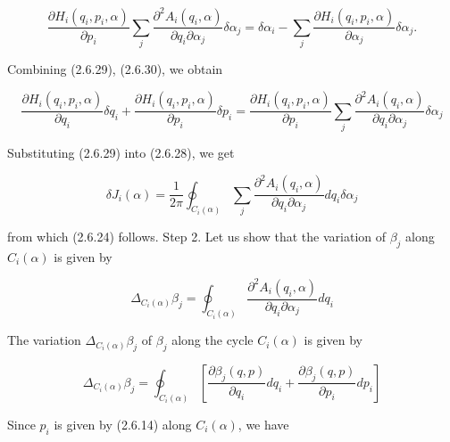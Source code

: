 \documentclass{article}
\begin{document}
\begin{equation*}
\frac{\partial H_{i}\left(q_{i}, p_{i}, \alpha\right)}{\partial p_{i}} \sum_{j} \frac{\partial^{2} A_{i}\left(q_{i}, \alpha\right)}{\partial q_{i} \partial \alpha_{j}} \delta \alpha_{j}=\delta \alpha_{i}-\sum_{j} \frac{\partial H_{i}\left(q_{i}, p_{i}, \alpha\right)}{\partial \alpha_{j}} \delta \alpha_{j} . \tag{2.6.30}
\end{equation*}
 

Combining (2.6.29), (2.6.30), we obtain
 
\begin{equation*}
\frac{\partial H_{i}\left(q_{i}, p_{i}, \alpha\right)}{\partial q_{i}} \delta q_{i}+\frac{\partial H_{i}\left(q_{i}, p_{i}, \alpha\right)}{\partial p_{i}} \delta p_{i}=\frac{\partial H_{i}\left(q_{i}, p_{i}, \alpha\right)}{\partial p_{i}} \sum_{j} \frac{\partial^{2} A_{i}\left(q_{i}, \alpha\right)}{\partial q_{i} \partial \alpha_{j}} \delta \alpha_{j} \tag{2.6.31}
\end{equation*}
 

Substituting (2.6.29) into (2.6.28), we get
 
\begin{equation*}
\delta J_{i}(\alpha)=\frac{1}{2 \pi} \oint_{C_{i}(\alpha)} \sum_{j} \frac{\partial^{2} A_{i}\left(q_{i}, \alpha\right)}{\partial q_{i} \partial \alpha_{j}} d q_{i} \delta \alpha_{j} \tag{2.6.32}
\end{equation*}
 
from which (2.6.24) follows.
Step 2. Let us show that the variation of $\beta_{j}$ along $C_{i}(\alpha)$ is given by
 
\begin{equation*}
\Delta_{C_{i}(\alpha)} \beta_{j}=\oint_{C_{i}(\alpha)} \frac{\partial^{2} A_{i}\left(q_{i}, \alpha\right)}{\partial q_{i} \partial \alpha_{j}} d q_{i} \tag{2.6.33}
\end{equation*}
 

The variation $\Delta_{C_{i}(\alpha)} \beta_{j}$ of $\beta_{j}$ along the cycle $C_{i}(\alpha)$ is given by
 
\begin{equation*}
\Delta_{C_{i}(\alpha)} \beta_{j}=\oint_{C_{i}(\alpha)}\left[\frac{\partial \beta_{j}(q, p)}{\partial q_{i}} d q_{i}+\frac{\partial \beta_{j}(q, p)}{\partial p_{i}} d p_{i}\right] \tag{2.6.34}
\end{equation*}
 

Since $p_{i}$ is given by (2.6.14) along $C_{i}(\alpha)$, we have
 
\end{document}
